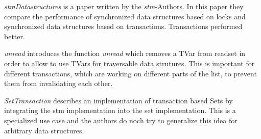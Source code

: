 \documentclass[a4paper,10pt]{article}
\begin{document}
\textit{stmDatastructures} is a paper written by the \textit{stm}-Authors. In this paper they compare the
performance of synchronized data structures based on locks and synchronized data structures based on transactions.
Transactions performed better.

\textit{unread} introduces the function \textit{unread} which removes a TVar from readset in order to allow to 
use TVars for traversable data strutures. This is important for different transactions, which are working on
different parts of the list, to prevent them from invalidating each other.

\textit{SetTransaction} describes an implementation of transaction based Sets by integrating the stm implementation
into the set implementation. This is a specialized use case and the authors do noch try to generalize this idea for
arbitrary data structures.





\end{document}
